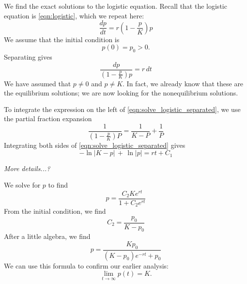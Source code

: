 \begin{xexample}
We find the exact solutions to the logistic equation.
Recall that the logistic equation is
\eqref{eqn:logistic}, which we repeat here:
\begin{equation}
  \frac{dp}{dt} = r\left(1-\frac{p}{K}\right)p
\end{equation}
We assume that the initial condition is
\begin{equation}
   p(0) = p_0 > 0.
\end{equation}
Separating gives
\begin{equation}
   \frac{dp}{\left(1-\frac{p}{K}\right)p} = r\,dt
\label{eqn:solve_logistic_separated}
\end{equation}
We have assumed that $p\ne 0$ and $p\ne K$.
In fact, we already know that these are the equilibrium
solutions; we are now looking for the nonequilibrium solutions.

To integrate the expression on the left
of \eqref{eqn:solve_logistic_separated}, we use the
partial fraction expansion
\begin{equation}
  \frac{1}{\left(1-\frac{p}{K}\right)P} = \frac{1}{K-P} + \frac{1}{P}
\end{equation}
Integrating both sides of \eqref{eqn:solve_logistic_separated}
gives
\begin{equation}
  -\ln|K-p| \,+\, \ln|p| = rt + C_1
\end{equation}

\noindent
\emph{More details...?}

\medskip
\noindent
We solve for $p$ to find
\begin{equation}
  p = \frac{C_2 K e^{rt}}{1+C_2 e^{rt}}
\end{equation}
From the initial condition, we find
\begin{equation}
  C_2 = \frac{p_0}{K-p_0}
\end{equation}
After a little algebra, we find
\begin{equation}
  p = \frac{Kp_0}{(K-p_0)e^{-rt} + p_0}
\end{equation}
We can use this formula to confirm our earlier analysis:
\begin{equation}
  \lim_{t\rightarrow\infty} p(t) = K.
\end{equation}
\end{xexample}
\newpage
%
